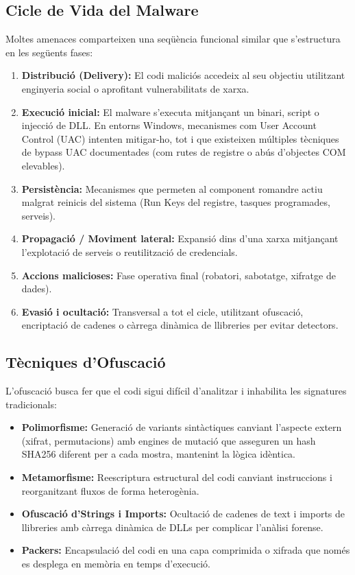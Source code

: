\documentclass[12pt,a4paper]{report}
\begin{document}
\subsection{Cicle de Vida del Malware}
Moltes amenaces comparteixen una seqüència funcional similar que s'estructura en les següents fases:
\begin{enumerate}
    \item \textbf{Distribució (Delivery):} El codi maliciós accedeix al seu objectiu utilitzant enginyeria social o aprofitant vulnerabilitats de xarxa.
    \item \textbf{Execució inicial:} El malware s'executa mitjançant un binari, script o injecció de DLL. En entorns Windows, mecanismes com User Account Control (UAC) intenten mitigar-ho, tot i que existeixen múltiples tècniques de bypass UAC documentades (com rutes de registre o abús d'objectes COM elevables).
    \item \textbf{Persistència:} Mecanismes que permeten al component romandre actiu malgrat reinicis del sistema (Run Keys del registre, tasques programades, serveis).
    \item \textbf{Propagació / Moviment lateral:} Expansió dins d'una xarxa mitjançant l'explotació de serveis o reutilització de credencials.
    \item \textbf{Accions malicioses:} Fase operativa final (robatori, sabotatge, xifratge de dades).
    \item \textbf{Evasió i ocultació:} Transversal a tot el cicle, utilitzant ofuscació, encriptació de cadenes o càrrega dinàmica de llibreries per evitar detectors.
\end{enumerate}

\subsection{Tècniques d'Ofuscació}
L'ofuscació busca fer que el codi sigui difícil d'analitzar i inhabilita les signatures tradicionals:
\begin{itemize}
    \item \textbf{Polimorfisme:} Generació de variants sintàctiques canviant l'aspecte extern (xifrat, permutacions) amb engines de mutació que asseguren un hash SHA256 diferent per a cada mostra, mantenint la lògica idèntica.
    \item \textbf{Metamorfisme:} Reescriptura estructural del codi canviant instruccions i reorganitzant fluxos de forma heterogènia.
    \item \textbf{Ofuscació d'Strings i Imports:} Ocultació de cadenes de text i imports de llibreries amb càrrega dinàmica de DLLs per complicar l'anàlisi forense.
    \item \textbf{Packers:} Encapsulació del codi en una capa comprimida o xifrada que només es desplega en memòria en temps d'execució.
\end{itemize}
\end{document}
